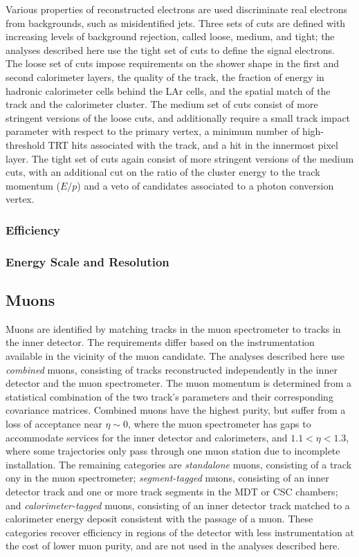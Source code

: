 Various properties of reconstructed electrons are used discriminate real electrons from backgrounds, such as misidentified jets. Three sets of cuts are defined with increasing levels of background rejection, called loose, medium, and tight; the analyses described here use the tight set of cuts to define the signal electrons. The loose set of cuts impose requirements on the shower shape in the first and second calorimeter layers, the quality of the track, the fraction of energy in hadronic calorimeter cells behind the LAr cells, and the spatial match of the track and the calorimeter cluster. The medium set of cuts consist of more stringent versions of the loose cuts, and additionally require a small track impact parameter with respect to the primary vertex, a minimum number of high-threshold TRT hits associated with the track, and a hit in the innermost pixel layer. The tight set of cuts again consist of more stringent versions of the medium cuts, with an additional cut on the ratio of the cluster energy to the track momentum ($E/p$) and a veto of candidates associated to a photon conversion vertex. 

\subsubsection{Efficiency}

\subsubsection{Energy Scale and Resolution}

\subsection{Muons}\label{sec:event-reconstruction-muons}
Muons are identified by matching tracks in the muon spectrometer to tracks in the inner detector. The requirements differ based on the instrumentation available in the vicinity of the muon candidate. The analyses described here use \emph{combined} muons, consisting of tracks reconstructed independently in the inner detector and the muon spectrometer. The muon momentum is determined from a statistical combination of the two track's parameters and their corresponding covariance matrices. Combined muons have the highest purity, but suffer from a loss of acceptance near $\eta\sim 0$, where the muon spectrometer has gaps to accommodate services for the inner detector and calorimeters, and $1.1<\eta<1.3$, where some trajectories only pass through one muon station due to incomplete installation. The remaining categories are \emph{standalone} muons, consisting of a track ony in the muon spectrometer; \emph{segment-tagged} muons, consisting of an inner detector track and one or more track segments in the MDT or CSC chambers; and \emph{calorimeter-tagged} muons, consisting of an inner detector track matched to a calorimeter energy deposit consistent with the passage of a muon. These categories recover efficiency in regions of the detector with less instrumentation at the cost of lower muon purity, and are not used in the analyses described here. 

